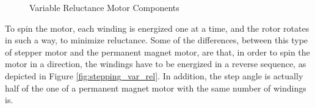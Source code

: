 \begin{figure}[htp]
    \centering%
    \hfill%
    \caption{Variable Reluctance Motor Components}%
    \label{fig:var_rel_components}%
\end{figure}
\newpage

To spin the motor, each winding is energized one at a time, and the rotor rotates in such a way, to minimize reluctance. Some of the differences, between this type of stepper motor and the permanent magnet motor, are that, in order to spin the motor in a direction, the windings have to be energized in a reverse sequence, as depicted in Figure \ref{fig:stepping_var_rel}. In addition, the step angle is actually half of the one of a permanent magnet motor with the same number of windings is.


